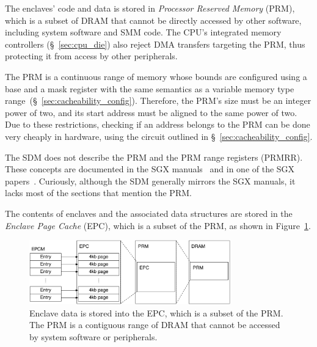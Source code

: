 \label{sec:sgx_prm}


The enclaves' code and data is stored in \textit{Processor Reserved Memory}
(PRM), which is a subset of DRAM that cannot be directly accessed by other
software, including system software and SMM code. The CPU's integrated memory
controllers (\S~\ref{sec:cpu_die}) also reject DMA transfers targeting the PRM,
thus protecting it from access by other peripherals.


The PRM is a continuous range of memory whose bounds are configured using a
base and a mask register with the same semantics as a variable memory type
range~(\S~\ref{sec:cacheability_config}). Therefore, the PRM's size must be an
integer power of two, and its start address must be aligned to the same power
of two. Due to these restrictions, checking if an address belongs to the PRM
can be done very cheaply in hardware, using the circuit outlined in
\S~\ref{sec:cacheability_config}.

The SDM does not describe the PRM and the PRM range registers (PRMRR). These
concepts are documented in the SGX
manuals~\cite{intel2013sgxmanual, intel2014sgx2manual} and in one of the SGX
papers~\cite{mckeen2013sgx}. Curiously, although the SDM generally mirrors the
SGX manuals, it lacks most of the sections that mention the PRM.


\label{sec:sgx_epc}


The contents of enclaves and the associated data structures are stored in the
\textit{Enclave Page Cache} (EPC), which is a subset of the PRM, as shown in
Figure~\ref{fig:sgx_epc}.

\begin{figure}[hbt]
  \centering
  \includegraphics[width=87mm]{figures/sgx_epc.pdf}
  \caption{
    Enclave data is stored into the EPC, which is a subset of the PRM. The
    PRM is a contiguous range of DRAM that cannot be accessed by system
    software or peripherals.
  }
  \label{fig:sgx_epc}
\end{figure}

